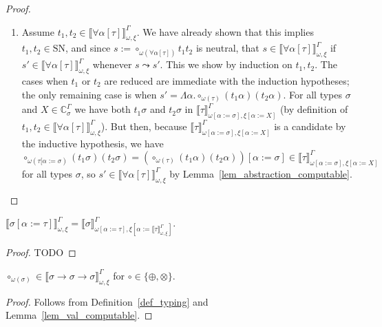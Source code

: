 \documentclass[runningheads,a4paper]{llncs}
\newcommand{\tabs}[2]{\Lambda #1.#2}
\newcommand{\subst}[2]{#1:=#2}
\newcommand{\SN}{\mathrm{SN}}
\newcommand{\Cb}{\mathbb{C}}
\newcommand{\val}[3]{\ensuremath{\llbracket#1\rrbracket_{#2}^{#3}}}
\begin{document}
\begin{proof}
\begin{enumerate}
  \item Assume
    $t_1,t_2 \in \val{\forall\alpha[\tau]}{\omega,\xi}{\Gamma}$. We
    have already shown that this implies $t_1,t_2 \in \SN$, and since
    $s := \circ_{\omega(\forall\alpha[\tau])} t_1 t_2$ is neutral, that
    $s \in \val{\forall\alpha[\tau]}{\omega,\xi}{\Gamma}$ if $s' \in
    \val{\forall\alpha[\tau]}{\omega,\xi}{\Gamma}$ whenever $s \leadsto
    s'$.  This we show by induction on $t_1,t_2$.
    The cases when $t_1$ or $t_2$ are reduced are immediate with the
    induction hypotheses; the only remaining case is when $s' =
    \tabs{\alpha}{\circ_{\omega(\tau)} (t_1 \alpha) (t_2 \alpha)}$.
    For all types $\sigma$ and $X \in \Cb_{\sigma}^\Gamma$ we have both
    $t_1 \sigma$ and $t_2 \sigma$ in $\val{\tau}{\omega[\subst{\alpha}{
    \sigma}],\xi[\subst{\alpha}{X}]}{\Gamma}$ (by definition of
    $t_1,t_2 \in \val{\forall\alpha[\tau]}{\omega,\xi}{\Gamma}$).
    But then, because $\val{\tau}{\omega[\subst{\alpha}{\sigma}],
    \xi[\subst{\alpha}{X}]}{\Gamma}$ is a candidate by the inductive
    hypothesis, we have $\circ_{\omega(\tau[\subst{\alpha}{\sigma})}
    (t_1 \sigma) (t_2\sigma) = (\circ_{\omega(\tau)} (t_1 \alpha) (t_2
    \alpha))[\subst{\alpha}{\sigma}] \in \val{\tau}{\omega[\subst{
    \alpha}{\sigma}],\xi[\subst{\alpha}{X}]}{\Gamma}$ for all types
    $\sigma$, so $s' \in \val{\forall\alpha[\tau]}{\omega,\xi}{\Gamma}$
    by Lemma~\ref{lem_abstraction_computable}.
  \end{enumerate}
\end{proof}

\begin{lemma}\label{lem_val_subst}
  $\val{\sigma[\subst{\alpha}{\tau}]}{\omega,\xi}{\Gamma} =
  \val{\sigma}{\omega[\subst{\alpha}{\tau}],\xi[\subst{\alpha}{\val{\tau}{\omega,\xi}{\Gamma}}]}{\Gamma}$.
\end{lemma}

\begin{proof}
  TODO
\end{proof}

\begin{lemma}
  $\circ_{\omega(\sigma)} \in \val{\sigma \to \sigma \to
    \sigma}{\omega,\xi}{\Gamma}$ for
  $\circ \in \{ \oplus, \otimes \}$.
\end{lemma}

\begin{proof}
  Follows from Definition~\ref{def_typing} and
  Lemma~\ref{lem_val_computable}.
\end{proof}
\end{document}
